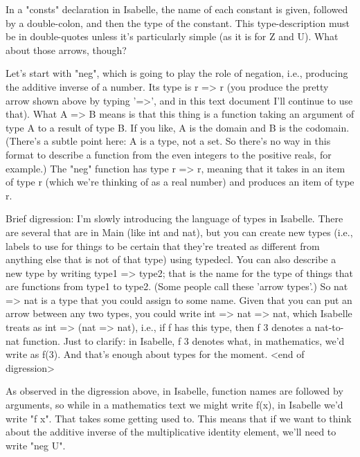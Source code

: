 In a "consts" declaration in Isabelle, the name of each constant is given, followed by a double-colon, and then the type of the constant. This type-description must be in double-quotes unless it's particularly simple (as it is for Z and U). What about those arrows, though? 

Let's start with "neg", which is going to play the role of negation, i.e., producing the additive inverse of a number. Its type is r => r  (you produce the pretty arrow shown above by typing '=>', and in this text document I'll continue to use that). What A => B means is that this thing is a function taking an argument of type A to a result of type B. If you like, A is the domain and B is the codomain. (There's a subtle point here: A is a type, not a set. So there's no way in this format to describe a function from the even integers to the positive reals, for example.) The "neg" function has type r => r, meaning that it takes in an item of type r (which we're thinking of as a real number) and produces an item of type r.

Brief digression: I'm slowly introducing the language of types in Isabelle. There are several that are in Main (like int and nat), but you can create new types (i.e., labels to use for things to be certain that they're treated as different from anything else that is not of that type) using typedecl. You can also describe a new type by writing type1 => type2; that is the name for the type of things that are functions from type1 to type2. (Some people call these 'arrow types'.) So nat => nat is a type that you could assign to some name. Given that you can put an arrow between any two types, you could write int => nat => nat, which Isabelle treats as int => (nat => nat), i.e., if f has this type, then f 3 denotes a nat-to-nat function. Just to clarify: in Isabelle, f 3 denotes what, in mathematics, we'd write as f(3). And that's enough about types for the moment. <end of digression> 

As observed in the digression above, in Isabelle, function names are followed by arguments, so while in a mathematics text we might write f(x), in Isabelle we'd write "f x". That takes some getting used to. This means that if we want to think about the additive inverse of the multiplicative identity element, we'll need to write "neg U".

